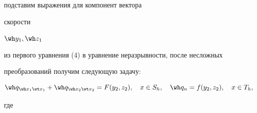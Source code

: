подставим выражения для компонент вектора


скорости


$\wh y_1,\wh z_1$


из первого уравнения (4) в уравнение неразрывности, после несложных


преобразований получим следующую задачу:


\begin{equation}


\wh q_{\wh x_1\wt x_1}+\wh q_{\wh x_2\wt x_2}=


F(y_2,z_2),\quad x\in S_h,\quad


\wh q_n=f(y_2,z_2),\quad x\in T_h,


\end{equation}


где



